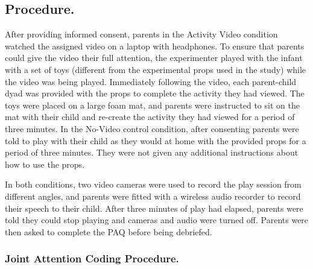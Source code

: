 \documentclass[10pt, letterpaper]{article}
\begin{document}
\subsection{Procedure.}\label{procedure.}

After providing informed consent, parents in the Activity Video
condition watched the assigned video on a laptop with headphones. To
ensure that parents could give the video their full attention, the
experimenter played with the infant with a set of toys (different from
the experimental props used in the study) while the video was being
played. Immediately following the video, each parent-child dyad was
provided with the props to complete the activity they had viewed. The
toys were placed on a large foam mat, and parents were instructed to sit
on the mat with their child and re-create the activity they had viewed
for a period of three minutes. In the No-Video control condition, after
consenting parents were told to play with their child as they would at
home with the provided props for a period of three minutes. They were
not given any additional instructions about how to use the props.

In both conditions, two video cameras were used to record the play
session from different angles, and parents were fitted with a wireless
audio recorder to record their speech to their child. After three
minutes of play had elapsed, parents were told they could stop playing
and cameras and audio were turned off. Parents were then asked to
complete the PAQ before being debriefed.

\subsubsection{Joint Attention Coding
Procedure.}\label{joint-attention-coding-procedure.}
\end{document}
